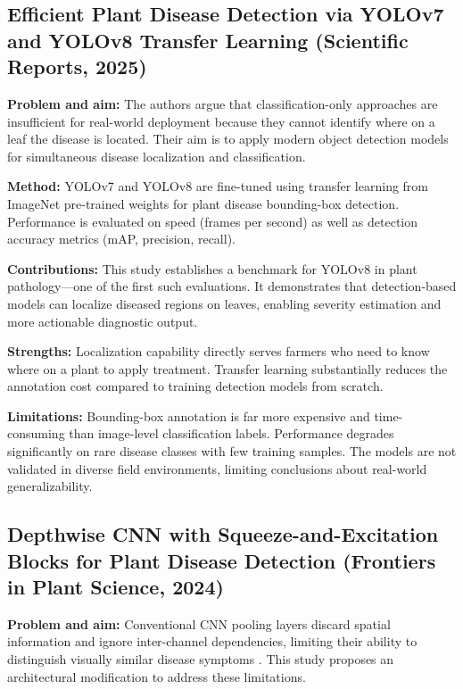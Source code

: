 \documentclass[10pt,twocolumn]{article}
\begin{document}
\subsection{Efficient Plant Disease Detection via YOLOv7 and YOLOv8 Transfer Learning (Scientific Reports, 2025)}

\textbf{Problem and aim:} The authors \cite{ScientificReports2025} argue that classification-only approaches are insufficient for real-world deployment because they cannot identify where on a leaf the disease is located. Their aim is to apply modern object detection models for simultaneous disease localization and classification.

\textbf{Method:} YOLOv7 and YOLOv8 are fine-tuned using transfer learning from ImageNet pre-trained weights for plant disease bounding-box detection. Performance is evaluated on speed (frames per second) as well as detection accuracy metrics (mAP, precision, recall).

\textbf{Contributions:} This study establishes a benchmark for YOLOv8 in plant pathology—one of the first such evaluations. It demonstrates that detection-based models can localize diseased regions on leaves, enabling severity estimation and more actionable diagnostic output.

\textbf{Strengths:} Localization capability directly serves farmers who need to know where on a plant to apply treatment. Transfer learning substantially reduces the annotation cost compared to training detection models from scratch.

\textbf{Limitations:} Bounding-box annotation is far more expensive and time-consuming than image-level classification labels. Performance degrades significantly on rare disease classes with few training samples. The models are not validated in diverse field environments, limiting conclusions about real-world generalizability.

\subsection{Depthwise CNN with Squeeze-and-Excitation Blocks for Plant Disease Detection (Frontiers in Plant Science, 2024)}

\textbf{Problem and aim:} Conventional CNN pooling layers discard spatial information and ignore inter-channel dependencies, limiting their ability to distinguish visually similar disease symptoms \cite{Frontiers2024}. This study proposes an architectural modification to address these limitations.
\end{document}
